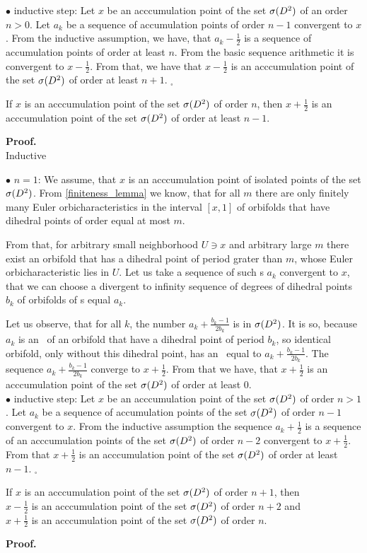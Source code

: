 $\bullet$ inductive step: Let $x$ be an acccumulation point of the set ${{\sigma}(D^2)}$ of an order 
$n > 0$. 
Let $a_k$ be a sequence of accumulation points of order $n-1$ convergent to $x$. From the 
inductive assumption, we have, that $a_k - \frac{1}{2}$ is a sequence of accumulation points 
of order at least $n$. From the basic sequence arithmetic it is convergent to $x-\frac{1}{2}$. 
From that, we have that $x-\frac{1}{2}$ is an acccumulation point of the set ${{\sigma}(D^2)}$ of order 
at least $n+1$. $_\square$
\begin{lemma}\label{second_order_lemma}
If $x$ is an acccumulation point of the set ${{\sigma}(D^2)}$ of order $n$, then $x+\frac{1}{2}$ is 
an acccumulation point of the set ${{\sigma}(D^2)}$ of order at least $n-1$.  
\end{lemma}
\noindent\textbf{Proof.} \\  
Inductive 

$\bullet$ $n = 1$: We assume, that $x$ is an acccumulation point of isolated points of the set 
${{\sigma}(D^2)}$. 
From \ref{finiteness_lemma} we know, that for all $m$ there are only finitely many 
Euler orbicharacteristics 
in the interval $[x,1]$ of orbifolds that have dihedral points of order equal at most $m$. 

From that, for arbitrary small neighborhood $U \ni x$ and arbitrary large $m$ there exist 
an orbifold 
that has a dihedral point of period grater than $m$, whose Euler orbicharacteristic lies in $U$. 
Let us take a sequence of such \Eoc s $a_k$ convergent to $x$, that we can choose 
a divergent to infinity sequence of degrees of dihedral points $b_k$ of orbifolds of \Eoc s 
equal $a_k$. 

Let us observe, that for all $k$, the number $a_k+\frac{b_k-1}{2b_k}$ is in ${{\sigma}(D^2)}$. 
It is so, because $a_k$ is an \Eoc\ of an orbifold that have a dihedral point of period $b_k$, so 
identical orbifold, only without this dihedral point, has an \Eoc\ equal to $a_k + 
\frac{b_k-1}{2b_k}$. 
The sequence $a_k + \frac{b_k-1}{2b_k}$ converge to $x+\frac{1}{2}$. From that we have, that 
$x + \frac{1}{2}$ is an acccumulation point of the set ${{\sigma}(D^2)}$ of order at least $0$. \\
$\bullet$ inductive step: Let $x$ be an acccumulation point of the set ${{\sigma}(D^2)}$ of order $n > 1$. 
Let $a_k$ be a sequence of accumulation points of the set ${{\sigma}(D^2)}$ of order $n-1$ 
convergent to $x$. 
From the inductive assumption the sequence $a_k + \frac{1}{2}$ is a sequence of an acccumulation
 points of the set ${{\sigma}(D^2)}$ of order $n-2$ convergent to $x + \frac{1}{2}$. From that 
 $x + \frac{1}{2}$ is an acccumulation point of the set ${{\sigma}(D^2)}$ of order at least 
 $n-1$. $_\square$ 
\begin{lemma}\label{third_order_lemma}
If $x$ is an acccumulation point of the set ${{\sigma}(D^2)}$ of order $n+1$, then \\
$x - \frac{1}{2}$ is an acccumulation point of the set ${{\sigma}(D^2)}$ of order $n+2$ and \\
$x + \frac{1}{2}$ is an acccumulation point of the set ${{\sigma}(D^2)}$ of order $n$. 
\end{lemma}
\noindent\textbf{Proof.} 

